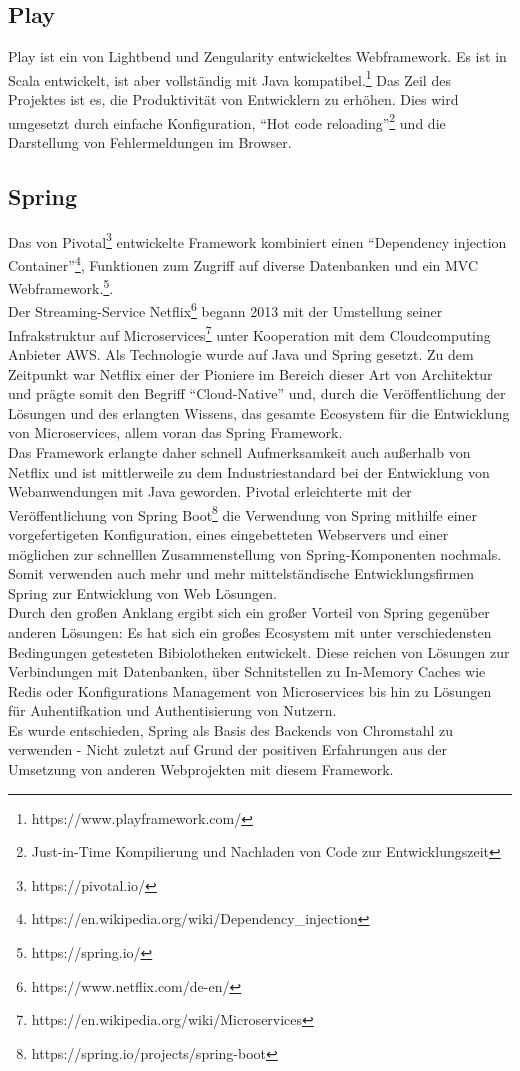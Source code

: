 \subsection{Play}
Play ist ein von Lightbend und Zengularity entwickeltes Webframework. Es ist in
Scala entwickelt, ist aber vollständig mit Java
kompatibel.\footnote{https://www.playframework.com/} Das Zeil des Projektes ist
es, die Produktivität von Entwicklern zu erhöhen. Dies wird umgesetzt durch
einfache Konfiguration, ``Hot code reloading''\footnote{Just-in-Time Kompilierung
  und Nachladen von Code zur Entwicklungszeit} und die Darstellung von
Fehlermeldungen im Browser.
\subsection{Spring}
Das von Pivotal\footnote{https://pivotal.io/} entwickelte Framework kombiniert einen ``Dependency injection
Container''\footnote{https://en.wikipedia.org/wiki/Dependency\_injection}, Funktionen zum Zugriff auf diverse Datenbanken und ein \ac{MVC}
Webframework.\footnote{https://spring.io/}.\\
Der Streaming-Service
Netflix\footnote{https://www.netflix.com/de-en/} begann 2013 mit der Umstellung
seiner Infrakstruktur auf Microservices\footnote{https://en.wikipedia.org/wiki/Microservices} unter Kooperation mit dem Cloudcomputing
Anbieter \ac{AWS}\cite{cloud-native-java}. Als Technologie wurde auf Java und
Spring gesetzt. Zu dem Zeitpunkt war Netflix einer
der Pioniere im Bereich dieser Art von Architektur und prägte somit den Begriff
``Cloud-Native'' und, durch die Veröffentlichung der Lösungen und des erlangten
Wissens, das gesamte Ecosystem für die Entwicklung von Microservices, allem
voran das Spring Framework.\\
Das Framework erlangte daher schnell Aufmerksamkeit auch außerhalb von Netflix
und ist mittlerweile zu dem Industriestandard bei der Entwicklung von
Webanwendungen mit Java geworden. Pivotal erleichterte mit der Veröffentlichung
von Spring Boot\footnote{https://spring.io/projects/spring-boot} die Verwendung
von Spring mithilfe einer vorgefertigeten Konfiguration, eines eingebetteten
Webservers und einer möglichen zur schnelllen Zusammenstellung von
Spring-Komponenten nochmals. Somit verwenden auch mehr und mehr mittelständische
Entwicklungsfirmen Spring zur Entwicklung von Web Lösungen.\\
Durch den großen Anklang ergibt sich ein großer Vorteil von Spring gegenüber
anderen Lösungen: Es hat sich ein großes Ecosystem mit unter verschiedensten
Bedingungen getesteten Bibiolotheken entwickelt. Diese reichen von Lösungen zur
Verbindungen mit Datenbanken, über Schnitstellen zu In-Memory Caches wie Redis
oder Konfigurations Management von Microservices bis hin zu Lösungen für
Auhentifkation und Authentisierung von Nutzern.\\
Es wurde entschieden, Spring als Basis des Backends von Chromstahl zu verwenden
- Nicht zuletzt auf Grund der positiven Erfahrungen aus der Umsetzung von
anderen Webprojekten mit diesem Framework.
